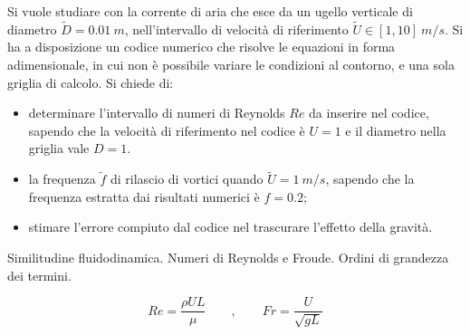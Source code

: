  \begin{exerciseS}
 Si vuole studiare con la corrente di aria che esce da un ugello verticale
 di diametro $\tilde{D}=0.01\ m$, nell'intervallo di velocità di riferimento
 $\tilde{U} \in [1,10] \ m/s$. Si ha a disposizione un codice numerico 
 che risolve le equazioni in forma adimensionale, in cui non è possibile
 variare le condizioni al contorno, e una sola griglia di calcolo.
 Si chiede di:
 \begin{itemize}
   \item determinare l'intervallo di numeri di Reynolds $Re$ da inserire
     nel codice, sapendo che la velocità di riferimento nel codice è $U=1$
     e il diametro nella griglia vale $D=1$.
   \item la frequenza $\tilde{f}$ di rilascio di vortici quando
     $\tilde{U}=1\ m/s$, sapendo che la frequenza estratta dai risultati
     numerici è $f=0.2$;
   \item stimare l'errore compiuto dal codice nel trascurare l'effetto
     della gravità.
 \end{itemize}
 \end{exerciseS}
 
\sol

\partone
Similitudine fluidodinamica. Numeri di Reynolds e Froude. Ordini di
 grandezza dei termini.

\begin{equation}
Re = \frac{\rho U L}{\mu} \qquad , \qquad Fr = \dfrac{U}{\sqrt{g L}}
\end{equation}

